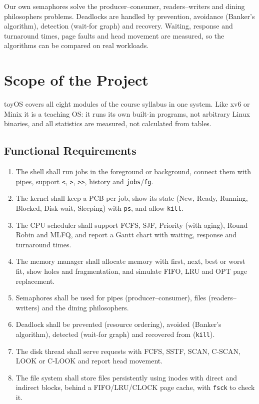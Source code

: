 \documentclass[12pt,a4paper]{article}
\begin{document}
Our own semaphores solve the producer--consumer, readers--writers and dining philosophers problems. Deadlocks are handled by prevention, avoidance (Banker's algorithm), detection (wait-for graph) and recovery. Waiting, response and turnaround times, page faults and head movement are measured, so the algorithms can be compared on real workloads.

\section{Scope of the Project}

toyOS covers all eight modules of the course syllabus in one system. Like xv6 or Minix it is a teaching OS: it runs its own built-in programs, not arbitrary Linux binaries, and all statistics are measured, not calculated from tables.

\subsection{Functional Requirements}
\begin{enumerate}[label=\textbf{FR\arabic*}, leftmargin=3.2em, itemsep=0pt, topsep=2pt]
    \item The shell shall run jobs in the foreground or background, connect them with pipes, support \texttt{<}, \texttt{>}, \texttt{>>}, history and \texttt{jobs}/\texttt{fg}.
    \item The kernel shall keep a PCB per job, show its state (New, Ready, Running, Blocked, Disk-wait, Sleeping) with \texttt{ps}, and allow \texttt{kill}.
    \item The CPU scheduler shall support FCFS, SJF, Priority (with aging), Round Robin and MLFQ, and report a Gantt chart with waiting, response and turnaround times.
    \item The memory manager shall allocate memory with first, next, best or worst fit, show holes and fragmentation, and simulate FIFO, LRU and OPT page replacement.
    \item Semaphores shall be used for pipes (producer--consumer), files (readers--writers) and the dining philosophers.
    \item Deadlock shall be prevented (resource ordering), avoided (Banker's algorithm), detected (wait-for graph) and recovered from (\texttt{kill}).
    \item The disk thread shall serve requests with FCFS, SSTF, SCAN, C-SCAN, LOOK or C-LOOK and report head movement.
    \item The file system shall store files persistently using inodes with direct and indirect blocks, behind a FIFO/LRU/CLOCK page cache, with \texttt{fsck} to check it.
\end{enumerate}
\end{document}
